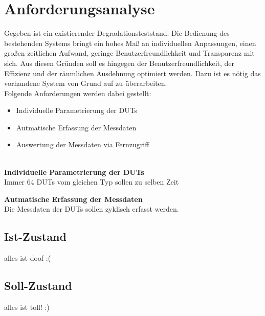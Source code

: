 
\chapter{Anforderungsanalyse}
\label{chapter_Anforderungsanalyse}
Gegeben ist ein existierender Degradationsteststand. Die Bedienung des bestehenden Systems bringt ein hohes Maß an individuellen Anpassungen, einen großen zeitlichen Aufwand, geringe Benutzerfreundlichkeit und Transparenz mit sich. Aus diesen Gründen soll es hingegen der Benutzerfreundlichkeit, der Effizienz und der räumlichen Ausdehnung optimiert werden. Dazu ist es nötig das vorhandene System von Grund auf zu überarbeiten.\\

Folgende Anforderungen werden dabei gestellt:
\begin{itemize}
\item Individuelle Parametrierung der \acp{DUT}
\item Autmatische Erfassung der Messdaten
\item Auswertung der Messdaten via Fernzugriff
\end{itemize}
\ \\
\textbf{Individuelle Parametrierung der \acp{DUT}}\\
Immer 64 \acp{DUT} vom gleichen Typ sollen zu selben Zeit


\textbf{Autmatische Erfassung der Messdaten}\\
Die Messdaten der \acp{DUT} sollen zyklisch erfasst werden. 


\clearpage
\section{Ist-Zustand}
\label{section_Ist-Zustand}
alles ist doof :(

\section{Soll-Zustand}
\label{section_Ist-Zustand}
alles ist toll! :)